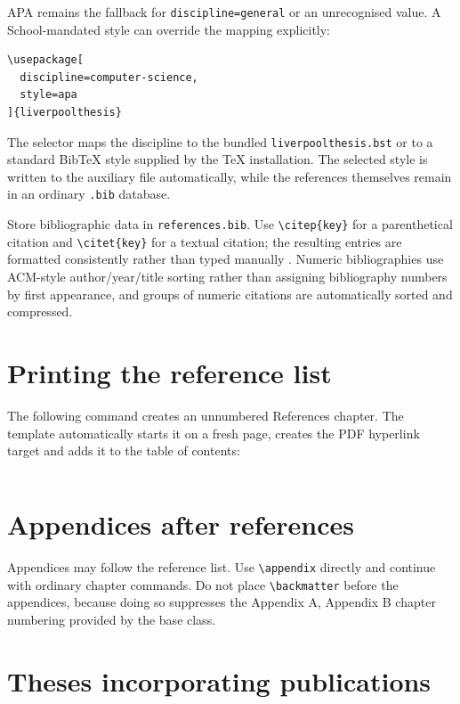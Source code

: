 \documentclass[oneside,header=auto]{liverpoolthesis}
\begin{document}
APA remains the fallback for \texttt{discipline=general} or an unrecognised value. A School-mandated style can override the mapping explicitly:

\begin{lstlisting}[language={[LaTeX]TeX}]
\usepackage[
  discipline=computer-science,
  style=apa
]{liverpoolthesis}
\end{lstlisting}

The selector maps the discipline to the bundled \texttt{liverpoolthesis.bst} or to a standard BibTeX style supplied by the TeX installation. The selected style is written to the auxiliary file automatically, while the references themselves remain in an ordinary \texttt{.bib} database.

Store bibliographic data in \texttt{references.bib}. Use \verb|\citep{key}| for a parenthetical citation and \verb|\citet{key}| for a textual citation; the resulting entries are formatted consistently rather than typed manually \citep{lamport1994}. Numeric bibliographies use ACM-style author/year/title sorting rather than assigning bibliography numbers by first appearance, and groups of numeric citations are automatically sorted and compressed.

\section{Printing the reference list}

The following command creates an unnumbered References chapter. The template automatically starts it on a fresh page, creates the PDF hyperlink target and adds it to the table of contents:

\begin{lstlisting}[language={[LaTeX]TeX}]

\end{lstlisting}

\section{Appendices after references}

Appendices may follow the reference list. Use \verb|\appendix| directly and continue with ordinary chapter commands. Do not place \verb|\backmatter| before the appendices, because doing so suppresses the Appendix A, Appendix B chapter numbering provided by the base class.

\section{Theses incorporating publications}
\end{document}
